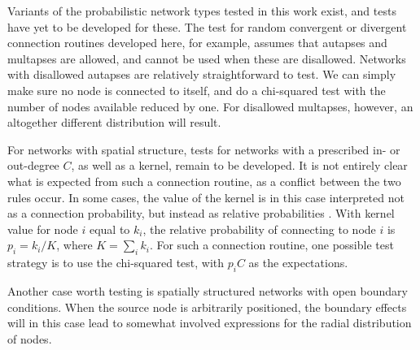 Variants of the probabilistic network types tested in this work exist, and tests have yet to be developed for these. The test for random convergent or divergent connection routines developed here, for example, assumes that autapses and multapses are allowed, and cannot be used when these are disallowed. Networks with disallowed autapses are relatively straightforward to test. We can simply make sure no node is connected to itself, and do a chi-squared test with the number of nodes available reduced by one. For disallowed multapses, however, an altogether different distribution will result. 

For networks with spatial structure, tests for networks with a prescribed in- or out-degree $C$, as well as a kernel, remain to be developed. It is not entirely clear what is expected from such a connection routine, as a conflict between the two rules occur. In some cases, the value of the kernel is in this case interpreted not as a connection probability, but instead as relative probabilities \cite{plesser2009specification}. With kernel value for node $i$ equal to $k_i$, the relative probability of connecting to node $i$ is $p_i = k_i / K$, where $K = \sum_i k_i$. For such a connection routine, one possible test strategy is to use the chi-squared test, with $p_i C$ as the expectations. 

Another case worth testing is spatially structured networks with open boundary conditions. When the source node is arbitrarily positioned, the boundary effects will in this case lead to somewhat involved expressions for the radial distribution of nodes. 



\clearchapter




